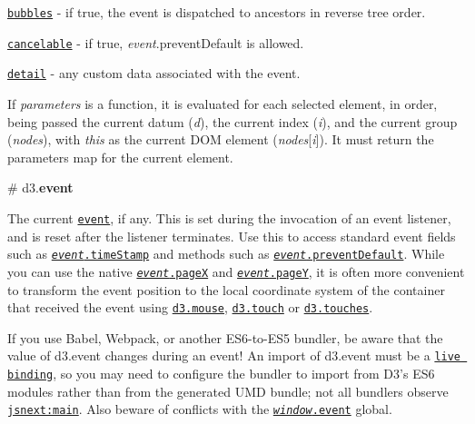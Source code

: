 \begin{DoxyItemize}
\item \href{https://www.w3.org/TR/dom/#dom-event-bubbles}{\tt {\ttfamily bubbles}} -\/ if true, the event is dispatched to ancestors in reverse tree order.
\item \href{https://www.w3.org/TR/dom/#dom-event-cancelable}{\tt {\ttfamily cancelable}} -\/ if true, {\itshape event}.prevent\+Default is allowed.
\item \href{https://www.w3.org/TR/dom/#dom-customevent-detail}{\tt {\ttfamily detail}} -\/ any custom data associated with the event.
\end{DoxyItemize}

If {\itshape parameters} is a function, it is evaluated for each selected element, in order, being passed the current datum ({\itshape d}), the current index ({\itshape i}), and the current group ({\itshape nodes}), with {\itshape this} as the current D\+OM element ({\itshape nodes}\mbox{[}{\itshape i}\mbox{]}). It must return the parameters map for the current element.

\label{_event}%
\# d3.{\bfseries event}

The current \href{https://developer.mozilla.org/en-US/docs/DOM/event}{\tt event}, if any. This is set during the invocation of an event listener, and is reset after the listener terminates. Use this to access standard event fields such as \href{https://www.w3.org/TR/dom/#dom-event-timestamp}{\tt {\itshape event}.time\+Stamp} and methods such as \href{https://www.w3.org/TR/dom/#dom-event-preventdefault}{\tt {\itshape event}.prevent\+Default}. While you can use the native \href{https://developer.mozilla.org/en/DOM/event.pageX}{\tt {\itshape event}.pageX} and \href{https://developer.mozilla.org/en/DOM/event.pageY}{\tt {\itshape event}.pageY}, it is often more convenient to transform the event position to the local coordinate system of the container that received the event using \href{#mouse}{\tt d3.\+mouse}, \href{#touch}{\tt d3.\+touch} or \href{#touches}{\tt d3.\+touches}.

If you use Babel, Webpack, or another E\+S6-\/to-\/\+E\+S5 bundler, be aware that the value of d3.\+event changes during an event! An import of d3.\+event must be a \href{http://www.2ality.com/2015/07/es6-module-exports.html}{\tt live binding}, so you may need to configure the bundler to import from D3’s E\+S6 modules rather than from the generated U\+MD bundle; not all bundlers observe \href{https://github.com/rollup/rollup/wiki/jsnext:main}{\tt jsnext\+:main}. Also beware of conflicts with the \href{https://developer.mozilla.org/en-US/docs/Web/API/Window/event}{\tt {\itshape window}.event} global.

